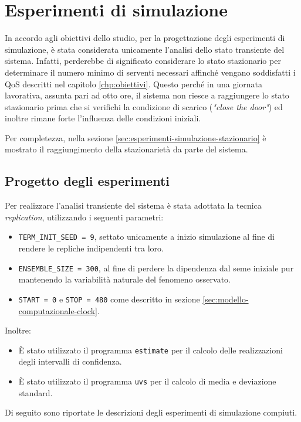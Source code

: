 \chapter{Esperimenti di simulazione}\label{chp:esperimenti-simulazione}
In accordo agli obiettivi dello studio, per la progettazione degli esperimenti di simulazione, è stata considerata unicamente l'analisi dello stato transiente del sistema. Infatti, perderebbe di significato considerare lo stato stazionario per determinare il numero minimo di serventi necessari affinché vengano soddisfatti i QoS descritti nel capitolo \ref{chp:obiettivi}. Questo perché in una giornata lavorativa, assunta pari ad otto ore, il sistema non riesce a raggiungere lo stato stazionario prima che si verifichi la condizione di scarico (\textit{"close the door"}) ed inoltre rimane forte l'influenza delle condizioni iniziali. 

Per completezza, nella sezione \ref{sec:esperimenti-simulazione-stazionario} è mostrato il raggiungimento della stazionarietà da parte del sistema. 

\section{Progetto degli esperimenti}\label{sec:esperimenti-simulazione-1}
Per realizzare l'analisi transiente del sistema è stata adottata la tecnica \textit{replication}, utilizzando i seguenti parametri:
\begin{itemize}
\item \texttt{TERM\_INIT\_SEED = 9}, settato unicamente a inizio simulazione al fine di rendere le repliche indipendenti tra loro.
\item \texttt{ENSEMBLE\_SIZE = 300}, al fine di perdere la dipendenza dal seme iniziale pur mantenendo la variabilità naturale del fenomeno osservato.
\item \texttt{START = 0} e \texttt{STOP = 480} come descritto in sezione \ref{sec:modello-computazionale-clock}.
\end{itemize}

Inoltre:
\begin{itemize}
\item È stato utilizzato il programma \texttt{estimate} per il calcolo delle realizzazioni degli intervalli di confidenza.
\item È stato utilizzato il programma \texttt{uvs} per il calcolo di media e deviazione standard.
\end{itemize}

Di seguito sono riportate le descrizioni degli esperimenti di simulazione compiuti.

